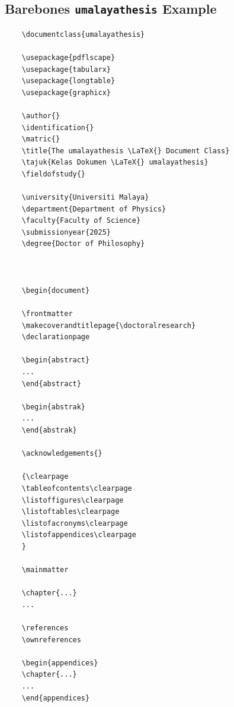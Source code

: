 \documentclass{umalayathesis}
\begin{document}
\begin{appendices}
\chapter{Barebones \texttt{umalayathesis} Example}

\begin{verbatim}
    \documentclass{umalayathesis}
    
    \usepackage{pdflscape}
    \usepackage{tabularx}
    \usepackage{longtable}
    \usepackage{graphicx}
    
    \author{}
    \identification{}
    \matric{}
    \title{The umalayathesis \LaTeX{} Document Class}
    \tajuk{Kelas Dokumen \LaTeX{} umalayathesis}
    \fieldofstudy{}
    
    \university{Universiti Malaya}
    \department{Department of Physics}
    \faculty{Faculty of Science}
    \submissionyear{2025}
    \degree{Doctor of Philosophy}
    
    
    
    \begin{document}
    
    \frontmatter
    \makecoverandtitlepage{\doctoralresearch}
    \declarationpage
    
    \begin{abstract}
    ...
    \end{abstract}
    
    \begin{abstrak}
    ...
    \end{abstrak}
    
    \acknowledgements{}
    
    {\clearpage
    \tableofcontents\clearpage
    \listoffigures\clearpage
    \listoftables\clearpage
    \listofacronyms\clearpage
    \listofappendices\clearpage
    }
    
    \mainmatter
    
    \chapter{...}
    ...
    
    \references
    \ownreferences
    
    \begin{appendices}
    \chapter{...}
    ...
    \end{appendices}
\end{verbatim}

\end{appendices}
\end{document}
